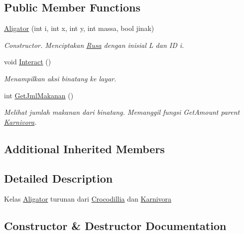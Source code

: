 \subsection*{Public Member Functions}
\begin{DoxyCompactItemize}
\item 
\hyperlink{classAligator_a19d0ebd3217864614103b0bbd343a48c}{Aligator} (int i, int x, int y, int massa, bool jinak)
\begin{DoxyCompactList}\small\item\em Constructor. Menciptakan \hyperlink{classRusa}{Rusa} dengan inisial \textquotesingle{}L\textquotesingle{} dan ID i. \end{DoxyCompactList}\item 
void \hyperlink{classAligator_ad314ab524831f78dccd550f545932895}{Interact} ()\hypertarget{classAligator_ad314ab524831f78dccd550f545932895}{}\label{classAligator_ad314ab524831f78dccd550f545932895}

\begin{DoxyCompactList}\small\item\em Menampilkan aksi binatang ke layar. \end{DoxyCompactList}\item 
int \hyperlink{classAligator_a58857a88d44930ecea013d1d71008567}{Get\+Jml\+Makanan} ()
\begin{DoxyCompactList}\small\item\em Melihat jumlah makanan dari binatang. Memanggil fungsi Get\+Amount parent \hyperlink{classKarnivora}{Karnivora}. \end{DoxyCompactList}\end{DoxyCompactItemize}
\subsection*{Additional Inherited Members}


\subsection{Detailed Description}
Kelas \hyperlink{classAligator}{Aligator} turunan dari \hyperlink{classCrocodillia}{Crocodillia} dan \hyperlink{classKarnivora}{Karnivora} 

\subsection{Constructor \& Destructor Documentation}
